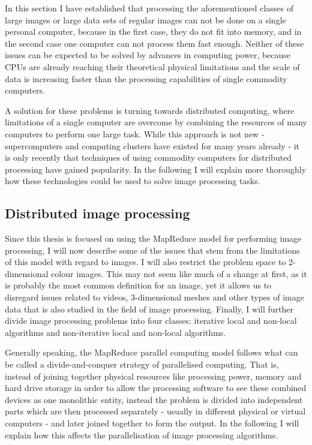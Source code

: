 \documentclass [12pt,a4paper]{report}
\begin{document}
In this section I have established that processing the aforementioned classes of large images or large data sets of regular images can not be done on a single personal computer, because in the first case, they do not fit into memory, and in the second case one computer can not process them fast enough. Neither of these issues can be expected to be solved by advances in computing power, because CPUs are already reaching their theoretical physical limitations  and the scale of data is increasing faster than the processing capabilities of single commodity computers. 

A solution for these problems is turning towards distributed computing, where limitations of a single computer are overcome by combining the resources of many computers to perform one large task. While this approach is not new - supercomputers and computing clusters have existed for many years already - it is only recently that techniques of using commodity computers for distributed processing have gained popularity. In the following I will explain more thoroughly how these technologies could be used to solve image processing tasks.

\subsection{Distributed image processing}

Since this thesis is focused on using the MapReduce model for performing image processing, I will now describe some of the issues that stem from the limitations of this model with regard to images. I will also restrict the problem space to 2-dimensional colour images. This may not seem like much of a change at first, as it is probably the most common definition for an image, yet it allows us to disregard issues related to videos, 3-dimensional meshes and other types of image data that is also studied in the field of image processing. Finally, I will further divide image processing problems into four classes: iterative local and non-local algorithms and non-iterative local and non-local algorithms.

Generally speaking, the MapReduce parallel computing model follows what can be called a divide-and-conquer strategy of parallelised computing. That is, instead of joining together physical resources like processing power, memory and hard drive storage in order to allow the processing software to see these combined devices as one monolithic entity, instead the problem is divided into independent parts which are then processed separately - usually in different physical or virtual computers - and later joined together to form the output. In the following I will explain how this affects the parallelisation of image processing algorithms.
\end{document}
